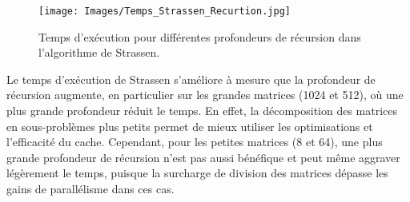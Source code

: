 \documentclass[../CSC_5RO06_TA.tex]{subfiles}
\begin{document}
\begin{figure}[H]
    \centering
    \texttt{[image: Images/Temps\_Strassen\_Recurtion.jpg]}
    \caption{Temps d'exécution pour différentes profondeurs de récursion dans l'algorithme de Strassen.}
    \label{fig:10}
\end{figure}

Le temps d'exécution de Strassen s'améliore à mesure que la profondeur de récursion augmente, en particulier sur les grandes matrices (1024 et 512), où une plus grande profondeur réduit le temps. En effet, la décomposition des matrices en sous-problèmes plus petits permet de mieux utiliser les optimisations et l'efficacité du cache. Cependant, pour les petites matrices (8 et 64), une plus grande profondeur de récursion n'est pas aussi bénéfique et peut même aggraver légèrement le temps, puisque la surcharge de division des matrices dépasse les gains de parallélisme dans ces cas.
\end{document}
